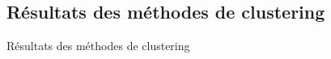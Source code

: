 \documentclass[aspectratio=169,professionalfonts, 12pt]{beamer}
\begin{document}
\begin{frame}
  \justifying
  \begin{minipage}{\textwidth}
    \begin{figure}[!h]
      \centering
      \qquad
    \end{figure}
  \end{minipage}
\end{frame}


\subsection{Résultats des méthodes de clustering}

\begin{frame}
  \justifying 
  \begin{minipage}{\textwidth}
    \begin{center}
      \huge Résultats des méthodes de clustering
    \end{center}
  \end{minipage}
\end{frame}

\end{document}
